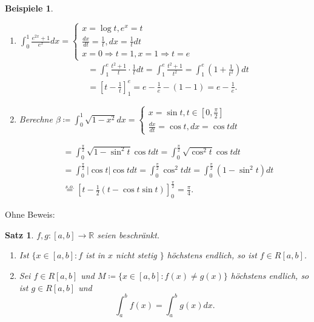 \documentclass[12pt]{extreport} %
\newcommand{\R}{\mathbb{R}}
\theoremstyle{named}
\theoremstyle{dotless}
\newtheorem{satz}[unnamedtheorem]{Satz}
\newtheorem*{beispiele}{Beispiele}
\begin{document}
\begin{beispiele} ~\
	\begin{enumerate}
		\item $\int_{0}^{1} \frac{e^{2x} + 1}{e^{x}} dx = \begin{cases} x = \log t, e^{x} = t \\ \frac{dx}{dt} = \frac{1}{t}, dx = \frac{1}{t} dt \\ x = 0 \Rightarrow t = 1, x = 1 \Rightarrow t = e \end{cases} $
			\begin{align*}
				& = \int_{1}^{e} \frac{t^{2} + 1}{t} \cdot \frac{1}{t} dt = \int_{1}^{e} \frac{t^{2} + 1}{t^{2}} = \int_{1}^{e} (1 + \frac{1}{t^{2}}) dt \\
				& = \left[ t - \frac{1}{t} \right]_{1}^{e} = e - \frac{1}{e} - (1 - 1) = e - \frac{
				1}{e}.
			\end{align*}
		\item Berechne $\beta \coloneqq \int_{0}^{1} \sqrt{1 - x^{2}} dx = \begin{cases} x = \sin t, t \in [0, \frac{\pi}{2}] \\ \frac{dx}{dt} = \cos t, dx = \cos t dt \end{cases}$
			
			\begin{align*}
				& = \int_{0}^{\frac{\pi}{2}} \sqrt{1 - \sin^{2}t} \cos t dt = \int_{0}^{\frac{\pi}{2}} \sqrt{\cos^{2} t} \cos t dt \\
				& = \int_{0}^{\frac{\pi}{2}} |\cos t| \cos t dt = \int_{0}^{\frac{\pi}{2}} \cos^{2} t dt = \int_{0}^{\frac{\pi}{2}} (1 - \sin^{2} t) dt \\
				& \overset{s.o.}{=} \left[ t - \frac{1}{2} (t - \cos t \sin t) \right]_{0}^{\frac{\pi}{2}} = \frac{\pi}{4}.
			\end{align*}
	\end{enumerate}
\end{beispiele}

Ohne Beweis:

\begin{satz} \label{10.15:satz}
	$f, g \colon [a, b] \rightarrow \R$ seien beschränkt.
	\begin{enumerate}
		\item Ist $\{ x \in [a, b]: f$ ist in $x$ nicht stetig $\}$ höchstens endlich, so ist $f \in R[a, b]$.
		\item Sei $f \in R[a, b]$ und $M \coloneqq \{ x \in [a, b] : f(x) \neq g(x) \}$ höchstens endlich, so ist $g \in R[a, b]$ und 
			$$ \int_{a}^{b} f(x) = \int_{a}^{b} g(x) dx. $$
	\end{enumerate}	
\end{satz}
\end{document}
